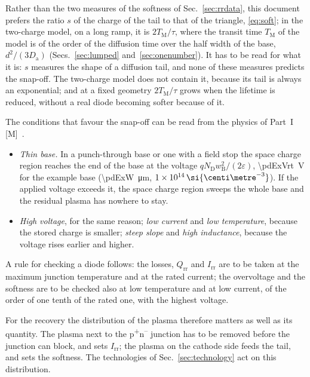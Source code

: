 \documentclass[10pt,a4paper]{scrartcl}
\newcommand{\Irr}{I_\mathrm{rr}}
\newcommand{\Qrr}{Q_\mathrm{rr}}
\newcommand{\TM}{T_\mathrm{M}}
\newcommand{\ND}{N_\mathrm{D}}
\newcommand{\wB}{w_\mathrm{B}}
\newcommand{\Da}{D_\mathrm{a}}
\newcommand{\Pp}{p\textsuperscript{+}}
\newcommand{\Nm}{n\textsuperscript{--}}
\newcommand{\cmc}{\si{\centi\metre^{-3}}}
\begin{document}
Rather than the two measures of the softness of Sec.~\ref{sec:rrdata}, this document prefers the ratio $s$ of the charge of the tail to that of the triangle, \eqref{eq:soft}; in the two-charge model, on a long ramp, it is $2\TM/\tau$, where the transit time $\TM$ of the model is of the order of the diffusion time over the half width of the base, $d^2/(3\Da)$ (Secs.~\ref{sec:lumped} and~\ref{sec:onenumber}). It has to be read for what it is: $s$ measures the shape of a diffusion tail, and none of these measures predicts the snap-off. The two-charge model does not contain it, because its tail is always an exponential; and at a fixed geometry $2\TM/\tau$ grows when the lifetime is reduced, without a real diode becoming softer because of it.

The conditions that favour the snap-off can be read from the physics of Part~I [M]~\cite{lutz}.
\begin{itemize}
\item \emph{Thin base.} In a punch-through base or one with a field stop the space charge region reaches the end of the base at the voltage $q\ND\wB^2/(2\varepsilon)$, \SI{\pdExVrt}{\volt} for the example base (\SI{\pdExW}{\micro\metre}, $\pdExNd\,\cmc$). If the applied voltage exceeds it, the space charge region sweeps the whole base and the residual plasma has nowhere to stay.
\item \emph{High voltage}, for the same reason; \emph{low current} and \emph{low temperature}, because the stored charge is smaller; \emph{steep slope} and \emph{high inductance}, because the voltage rises earlier and higher.
\end{itemize}
A rule for checking a diode follows: the losses, $\Qrr$ and $\Irr$ are to be taken at the maximum junction temperature and at the rated current; the overvoltage and the softness are to be checked also at low temperature and at low current, of the order of one tenth of the rated one, with the highest voltage.

For the recovery the distribution of the plasma therefore matters as well as its quantity. The plasma next to the \Pp\Nm{} junction has to be removed before the junction can block, and sets $\Irr$; the plasma on the cathode side feeds the tail, and sets the softness. The technologies of Sec.~\ref{sec:technology} act on this distribution.
\end{document}
